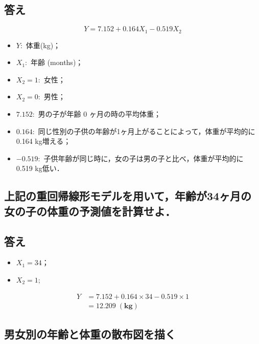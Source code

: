 \documentclass[]{problemset}
\providecommand{\tightlist}{%
  \setlength{\itemsep}{0pt}\setlength{\parskip}{0pt}}
\begin{document}
\hypertarget{-4}{%
\subsection{答え}\label{-4}}

\[
Y = 7.152 + 0.164 X_1 - 0.519X_2
\]

\begin{itemize}
\tightlist
\item
  \(Y:\) 体重(kg)；
\item
  \(X_1:\) 年齢 (months)；
\item
  \(X_2 = 1:\) 女性；
\item
  \(X_2 = 0:\) 男性；
\item
  \(7.152:\) 男の子が年齢 0 ヶ月の時の平均体重；
\item
  \(0.164:\)
  同じ性別の子供の年齢が1ヶ月上がることによって，体重が平均的に 0.164
  kg増える；
\item
  \(-0.519:\) 子供年齢が同じ時に，女の子は男の子と比べ，体重が平均的に
  0.519 kg低い．
\end{itemize}

\hypertarget{34}{%
\subsection{上記の重回帰線形モデルを用いて，年齢が34ヶ月の女の子の体重の予測値を計算せよ．}\label{34}}

\hypertarget{-5}{%
\subsection{答え}\label{-5}}

\begin{itemize}
\tightlist
\item
  \(X_1 = 34\)；
\item
  \(X_2 = 1\);
\end{itemize}

\[
\begin{aligned}
Y & = 7.152 + 0.164 \times 34 -0.519\times 1 \\
  & = 12.209\; \mathbf{(kg)}
\end{aligned}
\]

\bigskip\bigskip\bigskip\bigskip\bigskip\bigskip

\subsection{男女別の年齢と体重の散布図を描く}
\end{document}
